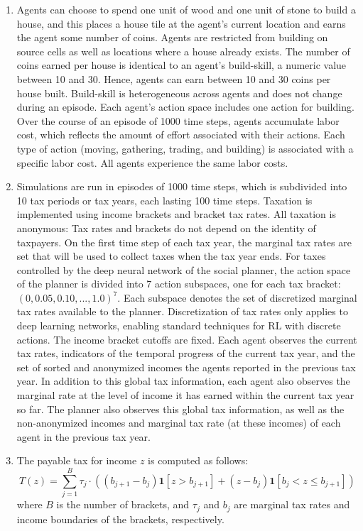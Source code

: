 \documentclass{article}
\begin{document}
\begin{enumerate}
	\item Agents can choose to spend one unit of wood and one unit of stone to build a house, and this places a house tile at the agent’s current location and earns the agent some number of coins. Agents are restricted from building on source cells as well as locations where a house already exists. The number of coins earned per house is identical to an agent’s build-skill, a numeric value between 10 and 30. Hence, agents can earn between 10 and 30 coins per house built. Build-skill is heterogeneous across agents and does not change during an episode. Each agent’s action space includes one action for building. Over the course of an episode of 1000 time steps, agents accumulate labor cost, which reflects the amount of effort associated with their actions. Each type of action (moving, gathering, trading, and building) is associated with a specific labor cost. All agents experience the same labor costs.
	
	\item Simulations are run in episodes of 1000 time steps, which is subdivided into 10 tax periods or tax years, each lasting 100 time steps. Taxation is implemented using income brackets and bracket tax rates. All taxation is anonymous: Tax rates and brackets do not depend on the identity of taxpayers. On the first time step of each tax year, the marginal tax rates are set that will be used to collect taxes when the tax year ends. For taxes controlled by the deep neural network of the social planner, the action space of the planner is divided into 7 action subspaces, one for each tax bracket: \( (0, 0.05, 0.10, ..., 1.0)^{7} \). Each subspace denotes the set of discretized marginal tax rates available to the planner. Discretization of tax rates only applies to deep learning networks, enabling standard techniques for RL with discrete actions. The income bracket cutoffs are fixed. Each agent observes the current tax rates, indicators of the temporal progress of the current tax year, and the set of sorted and anonymized incomes the agents reported in the previous tax year. In addition to this global tax information, each agent also observes the marginal rate at the level of income it has earned within the current tax year so far. The planner also observes this global tax information, as well as the non-anonymized incomes and marginal tax rate (at these incomes) of each agent in the previous tax year.
	
	\item The payable tax for income \( z \) is computed as follows:
	\begin{equation}\label{Equation3}
		T(z) = \sum_{j = 1}^{B} \tau_{j} \cdot ((b_{j + 1} - b_{j}) \mathbf{1} [z > b_{j + 1}] + (z - b_{j}) \mathbf{1} [b_{j} < z \leq b_{j + 1}])
	\end{equation}
	where \( B \) is the number of brackets, and \( \tau_{j} \) and \( b_{j} \) are marginal tax rates and income boundaries of the brackets, respectively.
	

\end{enumerate}
\end{document}

